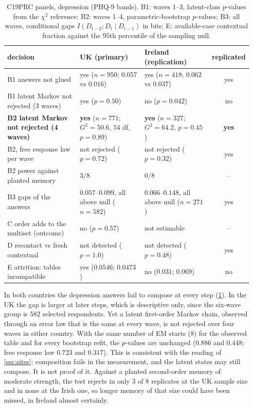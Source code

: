 \documentclass[11pt]{article}
\theoremstyle{definition}
\theoremstyle{remark}
\begin{document}
\begin{table}[ht]
\centering\footnotesize
\caption{C19PRC panels, depression (PHQ-9 bands). B1: waves 1--3, latent-class $p$-values from the $\chi^2$ reference; B2: waves 1--4,
parametric-bootstrap $p$-values; B3: all waves, conditional gaps $I(D_{t-2};D_t\mid D_{t-1})$ in bits; E: available-case contextual
fraction against the $95$th percentile of the sampling null.}\label{tab:c19}
\setlength{\tabcolsep}{3pt}\begin{tabular}{p{4.2cm}p{4.4cm}p{3.9cm}c}
\toprule
decision & UK (primary) & Ireland (replication) & replicated\\
\midrule
B1 answers not glued & yes ($n=950$; $0.057$ vs $0.016$) & yes ($n=418$; $0.062$ vs $0.037$) & yes\\
B1 latent Markov not rejected (3 waves) & yes ($p=0.50$) & no ($p=0.042$) & no\\
\textbf{B2 latent Markov not rejected (4 waves)} & \textbf{yes} ($n=771$; $G^2=50.6$, $54$ df, $p=0.89$) & \textbf{yes} ($n=327$; $G^2=64.2$, $p=0.45$) & \textbf{yes}\\
B2, free response law per wave & not rejected ($p=0.72$) & not rejected ($p=0.32$) & yes\\
B2 power against planted memory & $3/8$ & $0/8$ & --\\
B3 gaps of the answers & $0.057$--$0.099$, all above null ($n=582$) & $0.066$--$0.148$, all above null ($n=271$) & yes\\
C order adds to the multiset (outcome) & no ($p=0.57$) & not estimable & --\\
D recontact vs fresh contextual & not detected ($p=1.0$) & not detected ($p=0.48$) & yes\\
E attrition: tables incompatible & yes ($0.0546$; $0.0473$) & no ($0.031$; $0.069$) & no\\
\bottomrule
\end{tabular}
\end{table}

In both countries the depression answers fail to compose at every step (\cref{tab:c19}). In the UK the gap is larger at later steps,
which is descriptive only, since the six-wave group is $582$ selected respondents. Yet a latent first-order Markov chain, observed through
an error law that is the same at every wave, is not rejected over four waves in either country. With the same number of EM starts ($8$)
for the observed table and for every bootstrap refit, the $p$-values are unchanged ($0.886$ and $0.448$; free response law $0.723$ and
$0.317$). This is consistent with the reading of \cref{sec:sites}: composition fails in the measurement, and the latent states may still
compose. It is not proof of it. Against a planted second-order memory of moderate strength, the test rejects in only $3$ of $8$
replicates at the UK sample size and in none at the Irish one, so longer memory of that size could have been missed, in Ireland almost
certainly.
\end{document}
